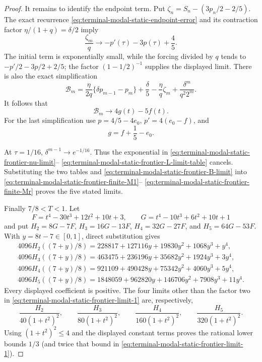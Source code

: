\begin{proof}
It remains to identify the endpoint term.  Put
$\zeta_n=S_n-(3p_n/2-2/5)$.  The exact recurrence
\eqref{eq:terminal-modal-static-endpoint-error} and its contraction factor
$\eta/(1+q)=\delta/2$ imply
\begin{equation}
 \frac{\zeta_m}{q}\longrightarrow
 -p'(\tau)-3p(\tau)+\frac45.
 \label{eq:terminal-modal-static-frontier-zeta-limit}
\end{equation}
The initial term is exponentially small, while the forcing divided by $q$
tends to $-p'/2-3p/2+2/5$; the factor $(1-1/2)^{-1}$ supplies the displayed
limit.  There is also the exact simplification
\begin{equation}
 \mathcal B_m=
 \frac{\eta}{2q}\{\delta p_{m-1}-p_m\}+\frac\delta5
 -\frac\eta q\zeta_m+\frac{\delta^m}{q^2 2^m}.
 \label{eq:terminal-modal-static-frontier-B-exact}
\end{equation}
It follows that
\begin{equation}
 \mathcal B_m\longrightarrow4g(t)-5f(t).
 \label{eq:terminal-modal-static-frontier-B-limit}
\end{equation}
For the last simplification use
$p=4/5-4e_0$, $p'=4(e_0-f)$, and
\begin{equation}
 g=f+\frac15-e_0.
 \label{eq:terminal-modal-static-frontier-g-identity}
\end{equation}

At $\tau=1/16$, $\delta^{m-1}\to e^{-1/16}$.  Thus the exponential in
\eqref{eq:terminal-modal-static-frontier-nu-limit}--
\eqref{eq:terminal-modal-static-frontier-L-limit-table} cancels.  Substituting
the two tables and \eqref{eq:terminal-modal-static-frontier-B-limit} into
\eqref{eq:terminal-modal-static-frontier-finite-M1}--
\eqref{eq:terminal-modal-static-frontier-finite-Mr} proves the five stated
limits.

Finally $7/8<T<1$.  Let
\[
 F=t^4-30t^3+12t^2+10t+3,\qquad
 G=t^4-10t^3+6t^2+10t+1
\]
and put $H_2=8G-7F$, $H_3=16G-13F$,
$H_4=32G-27F$, and $H_5=64G-53F$.  With
$y=8t-7\in[0,1]$, direct substitution gives
\begin{align*}
 4096H_2((7+y)/8)
 =228817+127116y+19830y^2+1068y^3+y^4,\\
 4096H_3((7+y)/8)
 =463475+236196y+35682y^2+1924y^3+3y^4,\\
 4096H_4((7+y)/8)
 =921109+490428y+75342y^2+4060y^3+5y^4,\\
 4096H_5((7+y)/8)
 =1848059+962820y+146706y^2+7908y^3+11y^4.
\end{align*}
Every displayed coefficient is positive.  The four limits other than the
factor two in \eqref{eq:terminal-modal-static-frontier-limit-1} are,
respectively,
\[
 \frac{H_2}{40(1+t^2)^2},\qquad
 \frac{H_3}{80(1+t^2)^2},\qquad
 \frac{H_4}{160(1+t^2)^2},\qquad
 \frac{H_5}{320(1+t^2)^2}.
\]
Using $(1+t^2)^2\le4$ and the displayed constant terms proves the rational
lower bounds $1/3$ (and twice that bound in
\eqref{eq:terminal-modal-static-frontier-limit-1}).
\end{proof}
